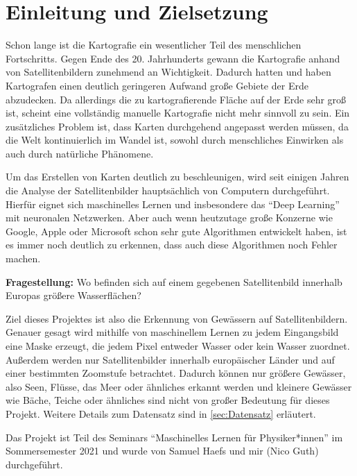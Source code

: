 \section{Einleitung und Zielsetzung}
\label{sec:Einleitung}

Schon lange ist die Kartografie ein wesentlicher Teil des menschlichen Fortschritts.
Gegen Ende des 20. Jahrhunderts gewann die Kartografie anhand von Satellitenbildern zunehmend an Wichtigkeit.
Dadurch hatten und haben Kartografen einen deutlich geringeren Aufwand große Gebiete der Erde abzudecken.
Da allerdings die zu kartografierende Fläche auf der Erde sehr groß ist, scheint eine vollständig manuelle Kartografie nicht mehr sinnvoll zu sein.
Ein zusätzliches Problem ist, dass Karten durchgehend angepasst werden müssen, da die Welt kontinuierlich im Wandel ist, 
sowohl durch menschliches Einwirken als auch durch natürliche Phänomene.

Um das Erstellen von Karten deutlich zu beschleunigen, wird seit einigen Jahren die Analyse der Satellitenbilder hauptsächlich von Computern durchgeführt.
Hierfür eignet sich maschinelles Lernen und insbesondere das \enquote{Deep Learning} mit neuronalen Netzwerken.
Aber auch wenn heutzutage große Konzerne wie Google, Apple oder Microsoft schon sehr gute Algorithmen entwickelt haben,
ist es immer noch deutlich zu erkennen, dass auch diese Algorithmen noch Fehler machen.

\textbf{Fragestellung:} Wo befinden sich auf einem gegebenen Satellitenbild innerhalb Europas größere Wasserflächen?

Ziel dieses Projektes ist also die Erkennung von Gewässern auf Satellitenbildern.
Genauer gesagt wird mithilfe von maschinellem Lernen zu jedem Eingangsbild eine Maske erzeugt, die jedem Pixel entweder Wasser oder kein Wasser zuordnet.
Außerdem werden nur Satellitenbilder innerhalb europäischer Länder und auf einer bestimmten Zoomstufe betrachtet.
Dadurch können nur größere Gewässer, also Seen, Flüsse, das Meer oder ähnliches erkannt werden und kleinere Gewässer wie Bäche, Teiche oder ähnliches sind nicht von großer Bedeutung für dieses Projekt.
Weitere Details zum Datensatz sind in \autoref{sec:Datensatz} erläutert.

Das Projekt ist Teil des Seminars \enquote{Maschinelles Lernen für Physiker*innen} im Sommersemester 2021 und wurde von Samuel Haefs und mir (Nico Guth) durchgeführt.
